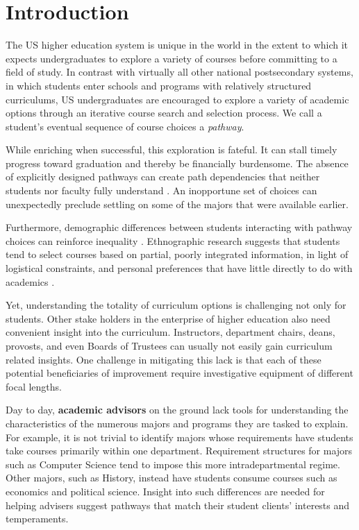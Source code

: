\section{Introduction}



The US higher education system is unique in the world in the extent to
which it expects undergraduates to explore a variety of courses before
committing to a field of study. In contrast with virtually all other
national postsecondary systems, in which students enter schools and
programs with relatively structured curriculums, US undergraduates are
encouraged to explore a variety of academic options through an
iterative course search and selection process. We call a student's
eventual sequence of course choices a {\it pathway}.

While enriching when successful, this exploration is fateful. It can
stall timely progress toward graduation \cite{bailey2015redesigning}
and thereby be financially burdensome. The absence of explicitly
designed pathways can create path dependencies that neither students
nor faculty fully understand \cite{chambliss2014college}. An
inopportune set of choices can unexpectedly preclude settling on some
of the majors that were available earlier. 

Furthermore, demographic differences between students interacting with
pathway choices can reinforce inequality
\cite{armstrong2013paying}. Ethnographic research suggests that
students tend to select courses based on partial, poorly integrated
information, in light of logistical constraints, and personal
preferences that have little directly to do with academics
\cite{nathan2006my,rosenbaum2011complexities, rosenbaum2007after}.

Yet, understanding the totality of curriculum options is challenging
not only for students. Other stake holders in the enterprise of higher
education also need convenient insight into the
curriculum. Instructors, department chairs, deans, provosts, and even
Boards of Trustees can usually not easily gain curriculum related
insights. One challenge in mitigating this lack is that each of these
potential beneficiaries of improvement require investigative equipment
of different focal lengths.

Day to day, {\bf academic advisors} on the ground lack tools for
understanding the characteristics of the numerous majors and programs
they are tasked to explain. For example, it is not trivial to identify
majors whose requirements have students take courses primarily within
one department. Requirement structures for majors such as Computer
Science tend to impose this more intradepartmental regime. Other
majors, such as History, instead have students consume courses such as
economics and political science. Insight into such differences are
needed for helping advisers suggest pathways that match their student
clients' interests and temperaments.

